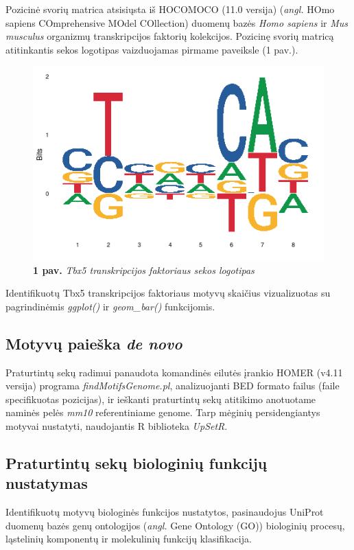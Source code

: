 \documentclass[12pt]{article}
\begin{document}
Pozicinė svorių matrica atsisiųsta iš HOCOMOCO\cite{HOCOMOCO} (11.0 versija)
(\emph{angl.} HOmo sapiens COmprehensive MOdel COllection) duomenų bazės
\emph{Homo sapiens} ir \emph{Mus musculus} organizmų transkripcijos faktorių
kolekcijos. Pozicinę svorių matricą atitinkantis sekos logotipas vaizduojamas
pirmame paveiksle (1 pav.).

\begin{figure}[htb]
    \begin{center}
        \includegraphics[width=0.5\linewidth]{../Figures/tbx5_motif.png}
        \caption*{\textbf{1 pav.} \emph{Tbx5 transkripcijos faktoriaus
                                        sekos logotipas}}
    \end{center}
\end{figure}

Identifikuotų Tbx5 transkripcijos faktoriaus motyvų skaičius vizualizuotas su
pagrindinėmis \emph{ggplot()} ir \emph{geom\_bar()} funkcijomis.

\subsection{Motyvų paieška \emph{de novo}}
Praturtintų sekų radimui panaudota komandinės eilutės įrankio HOMER\cite{HOMER}
(v4.11 versija) programa \emph{findMotifsGenome.pl}, analizuojanti BED formato
failus (faile specifikuotas pozicijas), ir ieškanti praturtintų sekų atitikimo
anotuotame naminės pelės \emph{mm10} referentiniame genome. Tarp mėginių
persidengiantys motyvai nustatyti, naudojantis R biblioteka
\emph{UpSetR}\cite{UPSETR}.

\subsection{Praturtintų sekų biologinių funkcijų nustatymas}
Identifikuotų motyvų biologinės funkcijos nustatytos, pasinaudojus
UniProt\cite{UNIPROT} duomenų bazės genų ontologijos (\emph{angl.} Gene
Ontology (GO)) biologinių procesų, ląstelinių komponentų ir molekulinių
funkcijų klasifikacija.
\end{document}

